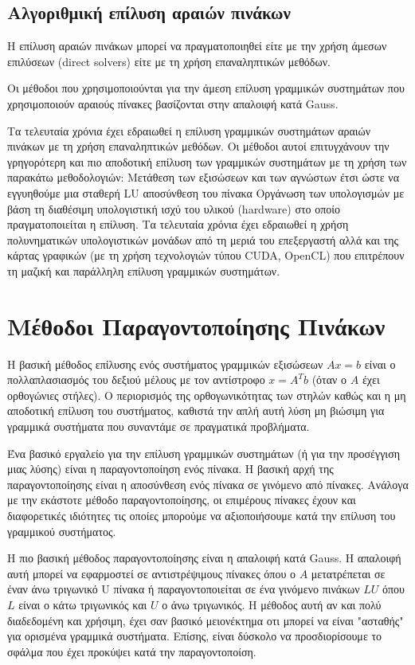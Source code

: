 \subsection{Αλγοριθμική επίλυση αραιών πινάκων}
Η επίλυση αραιών πινάκων μπορεί να πραγματοποιηθεί είτε με την χρήση άμεσων επιλύσεων \textlatin{(direct solvers)} είτε με τη χρήση επαναληπτικών μεθόδων.

Οι μέθοδοι που χρησιμοποιούνται για την άμεση επίλυση γραμμικών συστημάτων που χρησιμοποιούν αραιούς πίνακες βασίζονται στην απαλοιφή κατά \textlatin{Gauss}.

Τα τελευταία χρόνια έχει εδραιωθεί η επίλυση γραμμικών συστημάτων αραιών πινάκων με τη χρήση επαναληπτικών μεθόδων. Οι μέθοδοι αυτοί επιτυγχάνουν την γρηγορότερη και πιο αποδοτική επίλυση των γραμμικών συστημάτων με τη χρήση των παρακάτω μεθοδολογιών:
Μετάθεση των εξισώσεων και των αγνώστων έτσι ώστε να εγγυηθούμε μια σταθερή \textlatin{LU} αποσύνθεση του πίνακα
Οργάνωση των υπολογισμών με βάση τη διαθέσιμη υπολογιστική ισχύ του υλικού \textlatin{(hardware)} στο οποίο πραγματοποιείται η επίλυση. Τα τελευταία χρόνια έχει εδραιωθεί η χρήση πολυνηματικών υπολογιστικών μονάδων από τη μεριά του επεξεργαστή αλλά και της κάρτας γραφικών (με τη χρήση τεχνολογιών τύπου \textlatin{CUDA, OpenCL}) που επιτρέπουν τη μαζική και παράλληλη επίλυση γραμμικών συστημάτων.

\section{Μέθοδοι Παραγοντοποίησης Πινάκων}

Η βασική μέθοδος επίλυσης ενός συστήματος γραμμικών εξισώσεων $Ax = b$ είναι ο πολλαπλασιασμός του δεξιού μέλους με τον αντίστροφο $x = A^Tb$ (όταν ο $A$ έχει ορθογώνιες στήλες). Ο περιορισμός της ορθογωνικότητας των στηλών καθώς και η μη αποδοτική επίλυση του συστήματος, καθιστά την απλή αυτή λύση μη βιώσιμη για γραμμικά συστήματα που συναντάμε σε πραγματικά προβλήματα.

Ένα βασικό εργαλείο για την επίλυση γραμμικών συστημάτων (ή για την προσέγγιση μιας λύσης) είναι η παραγοντοποίηση ενός πίνακα. Η βασική αρχή της παραγοντοποίησης είναι η αποσύνθεση ενός πίνακα σε γινόμενο από πίνακες. Ανάλογα με την εκάστοτε μέθοδο παραγοντοποίησης, οι επιμέρους πίνακες έχουν και διαφορετικές ιδιότητες τις οποίες μπορούμε να αξιοποιήσουμε κατά την επίλυση του γραμμικού συστήματος.

Η πιο βασική μέθοδος παραγοντοποίησης είναι η απαλοιφή κατά \textlatin{Gauss}. Η απαλοιφή αυτή μπορεί να εφαρμοστεί σε αντιστρέψιμους πίνακες όπου ο $A$ μετατρέπεται σε έναν άνω τριγωνικό U πίνακα ή παραγοντοποιείται σε ένα γινόμενο πινάκων $LU$ όπου $L$ είναι ο κάτω τριγωνικός και $U$ ο άνω τριγωνικός. Η μέθοδος αυτή αν και πολύ διαδεδομένη και χρήσιμη, έχει σαν βασικό μειονέκτημα οτι μπορεί να είναι "ασταθής" για ορισμένα γραμμικά συστήματα. Επίσης, είναι δύσκολο να προσδιορίσουμε το σφάλμα που έχει προκύψει κατά την παραγοντοποίση.

